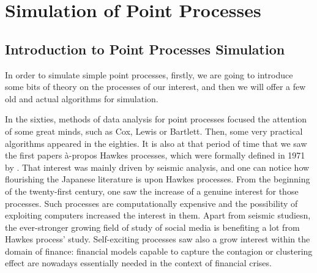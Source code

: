 \documentclass[11pt]{book}
\begin{document}
\frontmatter
\pagestyle{front}


\newpage




\thispagestyle{empty}%

                                                                







\mainmatter
\pagestyle{main}





\part{Simulation of Point Processes}
\chapter{Introduction to Point Processes Simulation}
In order to simulate simple point processes, firstly, we are going to introduce some bits of theory on the processes of our interest, and then we will offer a few old and actual algorithms for simulation. 

In the sixties, methods of data analysis for point processes focused the attention of some great minds, such as Cox, Lewis or Bartlett. Then, some very practical algorithms appeared in the eighties. It is also at that period of time that we saw the first papers à-propos Hawkes processes, which were formally defined in 1971 by \cite{Hawkes}. That interest was mainly driven by seismic analysis, and one can notice how flourishing the Japanese literature is upon Hawkes processes. From the beginning of the twenty-first century, one saw the increase of a genuine interest for those processes. Such processes are computationally expensive and the possibility of exploiting computers increased the interest in them. Apart from seismic studiesn, the ever-stronger growing field of study of social media is benefiting a lot from Hawkes process' study. Self-exciting processes saw also a grow interest within the domain of finance: financial models capable to capture the contagion or clustering effect are nowadays essentially needed in the context of financial crises.
\end{document}
